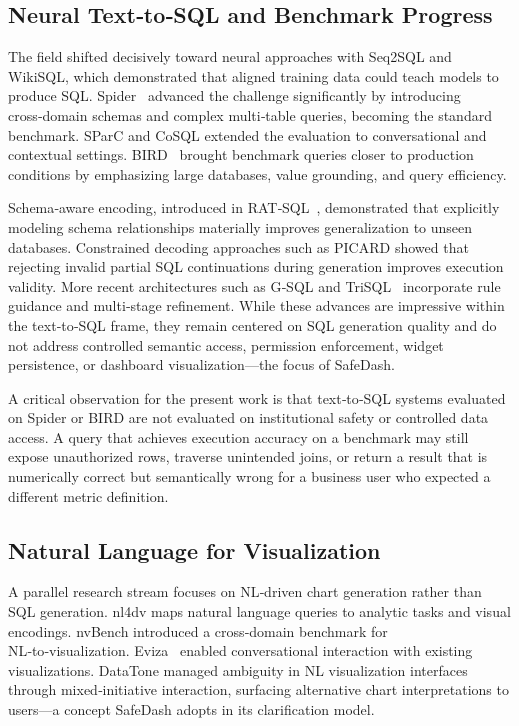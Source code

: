 \documentclass[11pt]{article}
\begin{document}
\subsection{Neural Text‑to‑SQL and Benchmark Progress}
The field shifted decisively toward neural approaches with Seq2SQL and WikiSQL\cite{zhong2018seq2sql}, which demonstrated that aligned training data could teach models to produce SQL. Spider~\cite{yu2018spider} advanced the challenge significantly by introducing cross‑domain schemas and complex multi‑table queries, becoming the standard benchmark. SParC and CoSQL\cite{yu2019sparc,yu2019cosql} extended the evaluation to conversational and contextual settings. BIRD~\cite{li2023bigbench} brought benchmark queries closer to production conditions by emphasizing large databases, value grounding, and query efficiency.

Schema‑aware encoding, introduced in RAT‑SQL~\cite{wang2020ratsql}, demonstrated that explicitly modeling schema relationships materially improves generalization to unseen databases. Constrained decoding approaches such as PICARD\cite{scholak2021picard} showed that rejecting invalid partial SQL continuations during generation improves execution validity. More recent architectures such as G‑SQL\cite{shalaan2025gsql} and TriSQL~\cite{su2026trisql} incorporate rule guidance and multi‑stage refinement. While these advances are impressive within the text‑to‑SQL frame, they remain centered on SQL generation quality and do not address controlled semantic access, permission enforcement, widget persistence, or dashboard visualization—the focus of SafeDash.

A critical observation for the present work is that text‑to‑SQL systems evaluated on Spider or BIRD are not evaluated on institutional safety or controlled data access. A query that achieves execution accuracy on a benchmark may still expose unauthorized rows, traverse unintended joins, or return a result that is numerically correct but semantically wrong for a business user who expected a different metric definition.

\subsection{Natural Language for Visualization}
A parallel research stream focuses on NL‑driven chart generation rather than SQL generation. nl4dv\cite{narechania2021nl4dv} maps natural language queries to analytic tasks and visual encodings. nvBench\cite{luo2021nvbench} introduced a cross‑domain benchmark for NL‑to‑visualization. Eviza~\cite{setlur2016eviza} enabled conversational interaction with existing visualizations. DataTone\cite{gao2015datatone} managed ambiguity in NL visualization interfaces through mixed‑initiative interaction, surfacing alternative chart interpretations to users—a concept SafeDash adopts in its clarification model.
\end{document}
